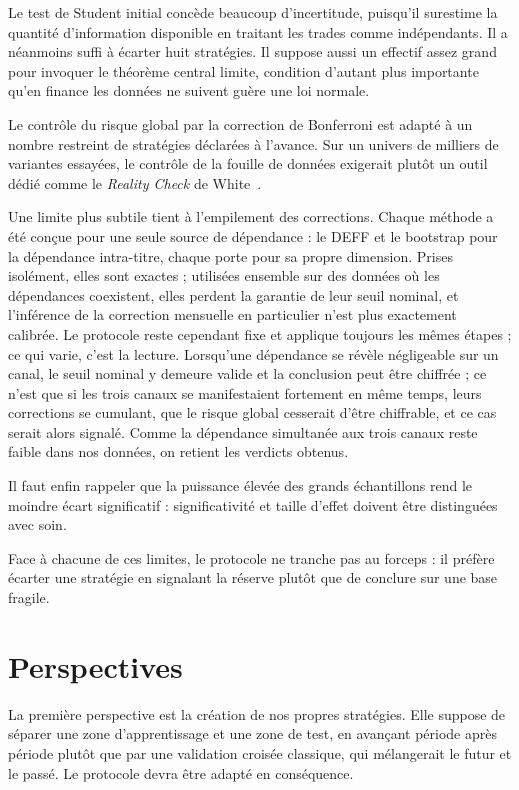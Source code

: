 Le test de Student initial concède beaucoup d'incertitude, puisqu'il surestime
la quantité d'information disponible en traitant les trades comme indépendants.
Il a néanmoins suffi à écarter huit stratégies. Il suppose aussi un effectif
assez grand pour invoquer le théorème central limite, condition d'autant plus
importante qu'en finance les données ne suivent guère une loi normale.

Le contrôle du risque global par la correction de Bonferroni est adapté à un
nombre restreint de stratégies déclarées à l'avance. Sur un univers de milliers
de variantes essayées, le contrôle de la fouille de données exigerait plutôt un
outil dédié comme le \emph{Reality Check} de White~\cite{white2000}.

Une limite plus subtile tient à l'empilement des corrections. Chaque méthode a
été conçue pour une seule source de dépendance : le DEFF et le bootstrap pour
la dépendance intra-titre, chaque porte pour sa propre dimension. Prises
isolément, elles sont exactes ; utilisées ensemble sur des données où les
dépendances coexistent, elles perdent la garantie de leur seuil nominal, et
l'inférence de la correction mensuelle en particulier n'est plus exactement
calibrée. Le protocole reste cependant fixe et applique toujours les mêmes
étapes ; ce qui varie, c'est la lecture. Lorsqu'une dépendance se révèle
négligeable sur un canal, le seuil nominal y demeure valide et la conclusion
peut être chiffrée ; ce n'est que si les trois canaux se manifestaient
fortement en même temps, leurs corrections se cumulant, que le risque global
cesserait d'être chiffrable, et ce cas serait alors signalé. Comme la
dépendance simultanée aux trois canaux reste faible dans nos données, on
retient les verdicts obtenus.

Il faut enfin rappeler que la puissance élevée des grands échantillons rend le
moindre écart significatif : significativité et taille d'effet doivent être
distinguées avec soin.

Face à chacune de ces limites, le protocole ne tranche pas au forceps : il
préfère écarter une stratégie en signalant la réserve plutôt que de conclure
sur une base fragile.

\section{Perspectives}
\label{sec:perspectives}

La première perspective est la création de nos propres stratégies. Elle
suppose de séparer une zone d'apprentissage et une zone de test, en avançant
période après période plutôt que par une validation croisée classique, qui
mélangerait le futur et le passé. Le protocole devra être adapté en
conséquence.

